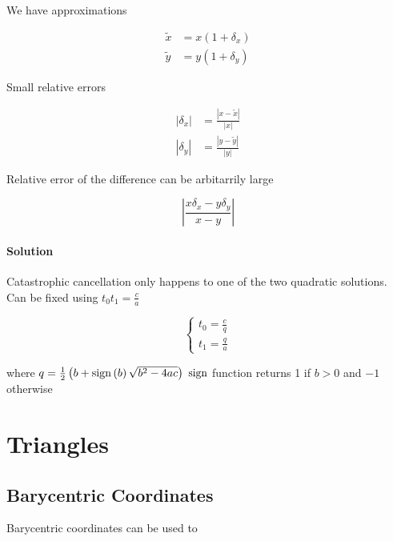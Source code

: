     We have approximations

    \begin{align}
      \tilde{x} &= x \left( 1 + \delta_{x} \right) \\
      \tilde{y} &= y \left( 1 + \delta_{y} \right)
    \end{align}

    Small relative errors

    \begin{align}
      \left| \delta_{x} \right| &= \frac{\left| x - \tilde{x} \right|}{\left| x \right|} \\
      \left| \delta_{y} \right| &= \frac{\left| y - \tilde{y} \right|}{\left| y \right|}
    \end{align}

    Relative error of the difference can be arbitarrily large

    \begin{equation}
      \left| \frac{x \delta_{x} - y \delta_{y}}{x - y} \right|
    \end{equation}

    \paragraph{Solution} Catastrophic cancellation only happens to one of the
    two quadratic solutions. Can be fixed using $ t_{0} t_{1} = \frac{c}{a} $

    \begin{equation}
      \begin{cases}
        t_{0} = \frac{c}{q} \\
        t_{1} = \frac{q}{a}
      \end{cases}
    \end{equation}

    where $ q = \frac{1}{2}\left( b + \operatorname{sign}\left( b \right) \sqrt{b^{2} - 4ac} \right) $
    $ \operatorname{sign} $ function returns 1 if $ b > 0 $ and $ - 1 $ otherwise

\section{Triangles}

  \subsection{Barycentric Coordinates}

    Barycentric coordinates can be used to

